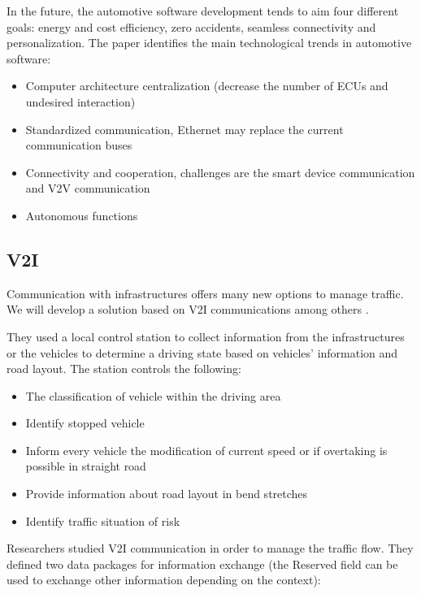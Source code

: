 In the future, the automotive software development tends to aim four different goals: energy and cost efficiency, zero accidents, seamless connectivity and personalization. The paper identifies the main technological trends in automotive software:

\begin{itemize}
    \item Computer architecture centralization (decrease the number of ECUs and undesired interaction)
    \item Standardized communication, Ethernet may replace the current communication buses
    \item Connectivity and cooperation, challenges are the smart device communication and V2V communication
    \item Autonomous functions
\end{itemize}

\subsection{V2I}

Communication with infrastructures offers many new options to manage traffic. We will develop a solution based on V2I communications among others \cite{v2i_management}.

They used a local control station to collect information from the infrastructures or the vehicles to determine a driving state based on vehicles' information and road layout. The station controls the following:
\begin{itemize}
    \item The classification of vehicle within the driving area
    \item Identify stopped vehicle
    \item Inform every vehicle the modification of current speed or if overtaking is possible in straight road
    \item Provide information about road layout in bend stretches
    \item Identify traffic situation of risk
\end{itemize}

Researchers studied  V2I communication in order to manage the traffic flow. They defined two data packages for information exchange (the Reserved field can be used to exchange other information depending on the context): 

